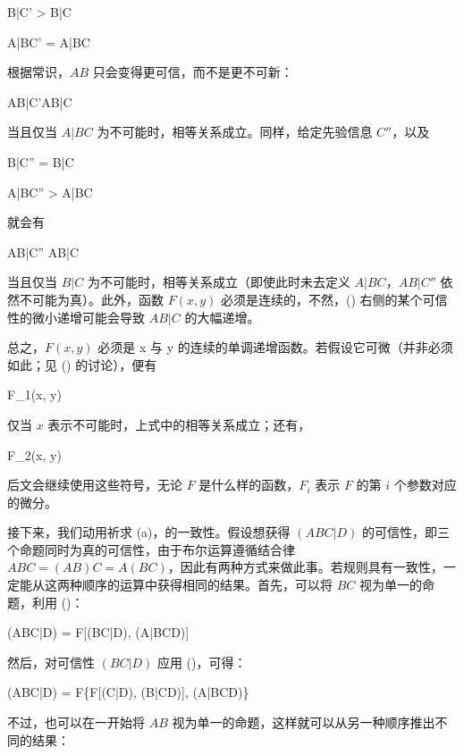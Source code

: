 \placeformula
\startformula
B|C' > B|C
\stopformula

\placeformula
\startformula
A|BC' = A|BC
\stopformula

根据常识，$AB$ 只会变得更可信，而不是更不可新：

\placeformula
\startformula
AB|C'\ge AB|C
\stopformula

当且仅当 $A|BC$ 为不可能时，相等关系成立。同样，给定先验信息 $C''$，以及

\placeformula
\startformula
B|C'' = B|C
\stopformula

\placeformula
\startformula
A|BC'' > A|BC
\stopformula

就会有

\placeformula
\startformula
AB|C'' \ge AB|C
\stopformula

当且仅当 $B|C$ 为不可能时，相等关系成立（即使此时未去定义 $A|BC$，$AB|C''$ 依然不可能为真）。此外，函数 $F(x, y)$ 必须是连续的，不然，() 右侧的某个可信性的微小递增可能会导致 $AB|C$ 的大幅递增。

总之，$F(x, y)$ 必须是 x 与 y 的连续的单调递增函数。若假设它可微（并非必须如此；见 (\in[function-eq]) 的讨论），便有

\placeformula
\startformula
F_1(x, y) \equiv {} 
\stopformula

仅当 $x$ 表示不可能时，上式中的相等关系成立；还有，

\placeformula
\startformula
F_2(x, y) \equiv {} 
\stopformula
\stopsubformulas


后文会继续使用这些符号，无论 $F$ 是什么样的函数，$F_i$ 表示 $F$ 的第 $i$ 个参数对应的微分。

接下来，我们动用祈求 (a)，的一致性。假设想获得 $(ABC|D)$ 的可信性，即三个命题同时为真的可信性，由于布尔运算遵循结合律 $ABC = (AB)C = A(BC)$，因此有两种方式来做此事。若规则具有一致性，一定能从这两种顺序的运算中获得相同的结果。首先，可以将 $BC$ 视为单一的命题，利用 ()：


\placeformula
\startformula
(ABC|D) = F[(BC|D), (A|BCD)]
\stopformula

然后，对可信性 $(BC|D)$ 应用 ()，可得：

\placeformula[subeq:1]
\startformula
(ABC|D) = F\{F[(C|D), (B|CD)], (A|BCD)\}
\stopformula

不过，也可以在一开始将 $AB$ 视为单一的命题，这样就可以从另一种顺序推出不同的结果：

